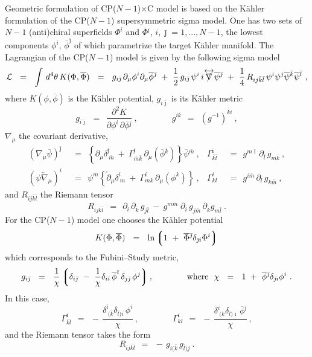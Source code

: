 \documentclass[12pt]{article}
\newcommand{\p}{\partial}
\newcommand{\ov}{\overline}
\newcommand{\mc}[1]{\mathcal{#1}}
\newcommand{\lgr}{\left\lgroup}
\newcommand{\rgr}{\right\rgroup}
\def\slashed#1{\setbox0=\hbox{$#1$}             %
   \dimen0=\wd0                                 %
   \setbox1=\hbox{/} \dimen1=\wd1               %
   \ifdim\dimen0>\dimen1                        %
      \rlap{\hbox to \dimen0{\hfil/\hfil}}      %
      #1                                        %
   \else                                        %
      \rlap{\hbox to \dimen1{\hfil$#1$\hfil}}   %
      /                                         %
   \fi}                                        %
\newcommand{\CPC}{CP($N-1$)$\times$C }
\begin{document}
\newcommand{\bi}{{\bar \imath}}
\newcommand{\bj}{{\bar \jmath}}
\newcommand{\bk}{{\bar k}}
\newcommand{\bl}{{\bar l}}
\newcommand{\bm}{{\bar m}}
	Geometric formulation of \CPC model is based on the K\"{a}hler formulation of the CP($N-1$) supersymmetric
	sigma model.
	One has two sets of $ N - 1 $ (anti)chiral superfields $ \Phi^i $ and $ \ov{\Phi}{}^\bj $, 
	$ i, \bj = 1,..., N-1 $, the lowest components $ \phi^i $, $ \ov{\phi}^\bj $ of which parametrize the target K\"{a}hler
	manifold.
The Lagrangian of the CP($N-1$) model is given by the following sigma model
\[
	\mc{L} ~~=~~ \int\, d^4\theta\, K(\Phi,\ov{\Phi}) ~~=~~ g_{i\bj}\,\p_\mu \phi^i \p_\mu\ov{\phi}{}^\bj
		~+~ \frac{1}{2}\, g_{i\bj}\, \psi^i\, i\overleftrightarrow{\slashed{\nabla}} \ov{\psi}{}^\bj 
		~+~ \frac{1}{4}\, R_{ij\bk\bl}\, \psi^i\psi^j \ov{\psi}{}^\bk \ov{\psi}{}^\bl~,
\]
	where $ K(\phi,\ov{\phi}) $ is the K\"ahler potential, 
	$ g_{i\bj} $ is its K\"ahler metric
\[
	g_{i\bj} ~~=~~ \frac{\p^2 K}{\p\phi^i\,{\p\ov{\phi}{}^\bj}}~,
	\qquad\qquad
	g^{i\bk} ~~=~~ \left(g^{-1}\right)^{\bk i}~,
\]
	$ \nabla_\mu $ the covariant derivative,
\begin{align*}
% 
	(\nabla_\mu \ov{\psi})^\bj & ~~=~~ \left\{ \p_\mu \delta^\bj_{\ \bm} ~+~
						\Gamma_{\bm\bk}^\bj\, \p_\mu(\ov{\phi}{}^\bk) \right\} \ov{\psi}{}^\bm~,
	& \Gamma^\bi_{\bk\bl} & ~~=~~ g^{m\bi}\,\p_\bl\, g_{m\bk}~,
	\\[3mm]
%
	(\psi \overleftarrow{\nabla}{}_\mu)^i & ~~=~~ 
			\psi^m \left\{ \overleftarrow{\p}{}_\mu\delta^i_{\ m} ~+~
						\Gamma^i_{mk}\, \p_\mu(\phi^k) \right\}~,
	& \Gamma^i_{kl} & ~~=~~ g^{i\bm}\, \p_l\, g_{k\bm}~,
\end{align*}
	and $ R_{ij\bk\bl} $ the Riemann tensor 
\[
	R_{ij\bk\bl} ~~=~~ \p_i\,\p_\bk\, g_{j\bl} ~-~ g^{m\bm}\; \p_i\, g_{j\bm}\, \p_\bk g_{m\bl}~.
\]
	For the CP($N-1$) model one chooses the K\"ahler potential
\[
	K(\Phi, \ov{\Phi}) ~~=~~ \ln \lgr 1 ~+~ \ov{\Phi}{}^\bj \delta_{\bj i} \Phi^i \rgr
\]
	which corresponds to the Fubini--Study metric,
\[
	g_{i\bj} ~~=~~ \frac{1}{\chi}\lgr  \delta_{i\bj} ~-~ \frac{1}{\chi}
				  \delta_{i\bi}\,\ov{\phi}^\bi\, \delta_{j\bj}\,\phi^j \rgr,
	\qquad\qquad \text{where~~}
	\chi ~~=~~ 1 ~+~ \ov{\phi}{}^\bj \delta_{\bj i} \phi^i~.
\]
	In this case,
\[
	\Gamma^\bi_{\bk\bl} ~~=~~ -\, \frac{\delta^\bi_{\ (\bk} \delta_{\bl) i}\, \phi^i}{\chi}\,,  
	\qquad\qquad 
	\Gamma^i_{kl} ~~=~~ -\, \frac{\delta^i_{\ (k} \delta_{l)\bi}\,\ov{\phi}{}^\bi}{\chi}\,,
\]
	and the Riemann tensor takes the form
\[
	R_{ij\bk\bl} ~~=~~ -\,g_{i(\bk}\,g_{\bl)j}~.
\]
	
\end{document}
